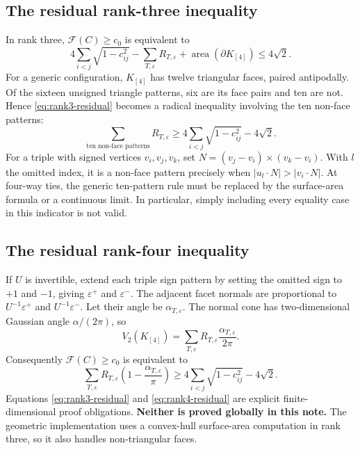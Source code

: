 \documentclass[11pt,a4paper]{article}
\theoremstyle{remark}\newtheorem{remark}[theorem]{Remark}
\newcommand{\F}{\mathcal F}
\begin{document}
\subsection{The residual rank-three inequality}
In rank three, $\F(C)\ge c_0$ is equivalent to
\begin{equation}\label{eq:rank3-residual}
 4\sum_{i<j}\sqrt{1-c_{ij}^2}
 -\sum_{T,\varepsilon}R_{T,\varepsilon}
 +\operatorname{area}(\partial K_{[4]})\leq4\sqrt2.
\end{equation}
For a generic configuration, $K_{[4]}$ has twelve triangular faces, paired antipodally. Of the sixteen unsigned triangle patterns, six are its face pairs and ten are not. Hence \eqref{eq:rank3-residual} becomes a radical inequality involving the ten non-face patterns:
\[
 \sum_{\text{ten non-face patterns}}R_{T,\varepsilon}
 \geq4\sum_{i<j}\sqrt{1-c_{ij}^2}-4\sqrt2.
\]
For a triple with signed vertices $v_i,v_j,v_k$, set
$N=(v_j-v_i)\times(v_k-v_i)$. With $l$ the omitted index, it is a non-face pattern precisely when
$|u_l\cdot N|>|v_i\cdot N|$.
At four-way ties, the generic ten-pattern rule must be replaced by the surface-area formula or a continuous limit. In particular, simply including every equality case in this indicator is not valid.

\subsection{The residual rank-four inequality}
If $U$ is invertible, extend each triple sign pattern by setting the omitted sign to $+1$ and $-1$, giving $\varepsilon^+$ and $\varepsilon^-$. The adjacent facet normals are proportional to $U^{-1}\varepsilon^+$ and $U^{-1}\varepsilon^-$. Let their angle be $\alpha_{T,\varepsilon}$. The normal cone has two-dimensional Gaussian angle $\alpha/(2\pi)$, so
\[
 V_2(K_{[4]})=\sum_{T,\varepsilon}
 R_{T,\varepsilon}\frac{\alpha_{T,\varepsilon}}{2\pi}.
\]
Consequently $\F(C)\ge c_0$ is equivalent to
\begin{equation}\label{eq:rank4-residual}
 \sum_{T,\varepsilon}R_{T,\varepsilon}
       \left(1-\frac{\alpha_{T,\varepsilon}}\pi\right)
 \geq4\sum_{i<j}\sqrt{1-c_{ij}^2}-4\sqrt2.
\end{equation}
Equations \eqref{eq:rank3-residual} and \eqref{eq:rank4-residual} are explicit finite-dimensional proof obligations. \textbf{Neither is proved globally in this note.} The geometric implementation uses a convex-hull surface-area computation in rank three, so it also handles non-triangular faces.
\end{document}

